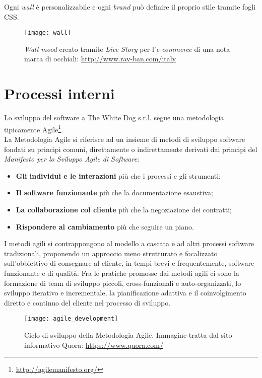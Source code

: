 Ogni \textit{wall} è personalizzabile e ogni \textit{brand} può definire il proprio stile tramite fogli CSS.

\label{Wall}
\begin{figure}[ht]
	\begin{center}
		\texttt{[image: wall]}
		\caption{\textit{Wall mood} creato tramite \textit{Live Story} per l'\textit{e-commerce} di una nota marca di occhiali: \url{http://www.ray-ban.com/italy}}
	\end{center}
\end{figure}
\FloatBarrier

\section{Processi interni}

Lo sviluppo del software a The White Dog s.r.l. segue una metodologia tipicamente Agile\footnote[5]{\url{http://agilemanifesto.org/}}. \\ 
La Metodologia Agile si riferisce ad un insieme di metodi di sviluppo software fondati su principi comuni, direttamente o indirettamente derivati dai principi del \textit{Manifesto per lo Sviluppo Agile di Software}: 

\begin{itemize}
	\item \textbf{Gli individui e le interazioni} più che i processi e gli strumenti;
	\item \textbf{Il software funzionante} più che la documentazione esaustiva;
	\item \textbf{La collaborazione col cliente} più che la negoziazione dei contratti;
	\item \textbf{Rispondere al cambiamento} più che seguire un piano.
\end{itemize}

I metodi agili si contrappongono al modello a cascata e ad altri processi software tradizionali, proponendo un approccio meno strutturato e focalizzato sull'obbiettivo di consegnare al cliente, in tempi brevi e frequentemente, software funzionante e di qualità. Fra le pratiche promosse dai metodi agili ci sono la formazione di team di sviluppo piccoli, cross-funzionali e auto-organizzati, lo sviluppo iterativo e incrementale, la pianificazione adattiva e il coinvolgimento diretto e continuo del cliente nel processo di sviluppo. 

\label{Metodologia Agile}
\begin{figure}[ht]
	\begin{center}
		\texttt{[image: agile\_development]}
		\caption{Ciclo di sviluppo della Metodologia Agile. Immagine tratta dal sito informativo Quora: \url{https://www.quora.com/}}
	\end{center}
\end{figure}
\FloatBarrier

